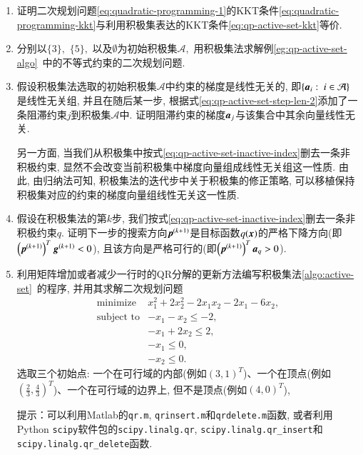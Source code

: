 \begin{enumerate}
\item 证明二次规划问题\eqref{eq:quadratic-programming-1}的KKT条件\eqref{eq:quadratic-programming-kkt}与利用积极集表达的KKT条件\eqref{eq:qp-active-set-kkt}等价.

\item 分别以$\{3\},$ $\{5\},$ 以及$\emptyset$为初始积极集$\mathcal{A},$ 用积极集法求解例\ref{eg:qp-active-set-algo}~中的不等式约束的二次规划问题.

\item 假设积极集法选取的初始积极集$\mathcal{A}$中约束的梯度是线性无关的, 即$\{ {\bm{a}}_i: ~ i \in \mathcal{A} \}$是线性无关组, 并且在随后某一步, 根据式\eqref{eq:qp-active-set-step-len-2}添加了一条阻滞约束$j$到积极集$\mathcal{A}$中. 证明阻滞约束的梯度${\bm{a}}_j$与该集合中其余向量线性无关.

另一方面, 当我们从积极集中按式\eqref{eq:qp-active-set-inactive-index}删去一条非积极约束, 显然不会改变当前积极集中梯度向量组成线性无关组这一性质. 由此, 由归纳法可知, 积极集法的迭代步中关于积极集的修正策略, 可以移植保持积极集对应的约束的梯度向量组线性无关这一性质.

\item 假设在积极集法的第$k$步, 我们按式\eqref{eq:qp-active-set-inactive-index}删去一条非积极约束$q.$ 证明下一步的搜索方向${\bm{p}}^{(k+1)}$是目标函数$q({\bm{x}})$的严格下降方向(即$\left( {\bm{p}}^{(k+1)} \right)^T {\bm{g}}^{(k+1)} < 0$), 且该方向是严格可行的(即$\left( {\bm{p}}^{(k+1)} \right)^T {\bm{a}}_q > 0$).

\item 利用矩阵增加或者减少一行时的QR分解的更新方法编写积极集法\ref{algo:active-set}~的程序, 并用其求解二次规划问题
\begin{equation*}
\begin{array}{cl}
\text{minimize} & x_1^2 + 2x_2^2 -2x_1x_2 - 2x_1 - 6x_2, \\
\text{subject to} & -x_1 - x_2 \leqslant -2, \\
& -x_1 + 2x_2 \leqslant 2, \\
& -x_1 \leqslant 0,\\
& -x_2 \leqslant 0.
\end{array}
\end{equation*}
选取三个初始点: 一个在可行域的内部(例如$(3, 1)^T$)、一个在顶点(例如$(\frac{2}{3}, \frac{4}{3})^T$)、一个在可行域的边界上, 但不是顶点(例如$(4, 0)^T$),

提示：可以利用Matlab的\texttt{qr.m}, \texttt{qrinsert.m}和\texttt{qrdelete.m}函数, 或者利用Python \texttt{scipy}软件包的\texttt{scipy.linalg.qr}, \texttt{scipy.linalg.qr\_insert}和\texttt{scipy.linalg.qr\_delete}函数.


\end{enumerate}
